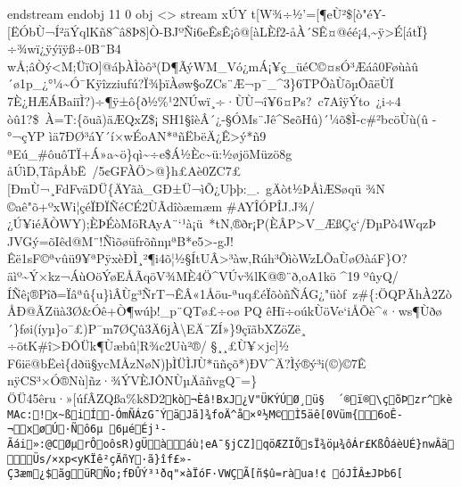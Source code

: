 \documentclass[
]{article}
\begin{document}
{{{{{{{endstream
endobj
11 0 obj
\textless{}\textgreater{}
stream
xÚY t{[}W¾÷½'={[}¶eÙ²\${[}ò"éY-{[}ËÓbÙ¬Í²äÝqlKñ8\^{}â8Þ8{]}Ò-BJºÑi6\textquotesingle eÊsÊ¡ô@{[}àLÈf2-åÀ´SÊ¤@éé¡4,\textasciitildeÿ\textgreater É{[}átÏ\}÷¾wï¿\textbar ÿýïÿß÷0B¨B4
wÅ;âÒý\textless M;ÜïO{]}@\textquotesingle áþÀÌòô³(D¶ÃýWM\_Vó¿mÁ¡¥ç\_üéC©¤sÓ³Æá\textquotesingle â0Føùàû´ø1p\_¿°¼\textasciitilde Ó¯Kÿîzziufú?Ï¾þïÀøw§oZCs¨Æ¬p¯\_\^{}3\}6TPÕàÙõµÕãëÙÏ 7È¿HÆÁBaiïÌ?)÷¶ÿ±ô\{ð½\%¹2NÚwï¸÷·ÙÙ¬î¥6¤Ps?~c7AîÿÝto~¿i÷4
òû1?\$~À=T:\{õuã)äÆQxZ\$¡ SH1§îèÂ´¿-§ÓMs¨Jê\^{}S¢õHû)´¼õ\$Ì\textbar{}-c\#²bcöÙ­ù(û -°¬çYP
ìä7ÐØ³áY´í×wÉoAN*ªñËbëÄ¿Ê\textgreaterý*ñ9ªEú\_\#ôuôTÏ+Á»a\textasciitilde ö\}qì\textasciitilde÷e\$Á½Èc\textasciitilde ü:½øjöMüzö8g
åÚìD,TâpÅbË~\textquotesingle/5¢GFÀÖ\textgreater@\}h£Aè0ZC7£{[}ÐmÙ¬¸FdFväDÜ\{ÄYãà\_GÐ±Ü¬ìÕ¿Uþþ­:\_.~gÄòt½ÞÅìÆSøqü
¾N©aê"õ+ºxWi¦çéÏÐÏÑéCÉ2ÙÃdîòæmæm \#AYÎÓPÎJ.J¾/¿Ú¥iéÃÒWY);ÈÞÉòMöRAyA¨`¹à¡ü~*tN,\textbar®ðr¡P(ÈÂP\textgreaterV\_ÆßÇç`/ÐµPò4WqzÞ
JVGý=õIêd@M¨!ÑìõøüfrõñnµªB*e5\textgreater\textquotesingle-gJ!Êë1sF©ªvûü9¥ªPÿxèÐÌ¸²¶i4õ¦½§ÍtUÂ\textgreater³àw,Rúh³ÕìòWzLÕ­aÙøØàáF\}O?äìº\textasciitilde Ý×kz¬ÁùOöÝøEÅÃqöV¾MÈ4Ö\^{}VÚv¾lK@®¨ð,oA1kö \^{}19 ºûyQ/ÍÑ\textbar ê¡®Pî\textbar ð=Ïâªû\{u\}ìÂÙg³ÑrT¬ÊÂ«1Åöu-ªuq£éÏ\textbar õòñÑÁG¿"üòf~z\#\{:ÖQPÃhÀ2Zò
ÅÐ@ÃZüà3Ø\&Óê+Ò¶wúþ!\_p¨QTø£÷oø
PQ
êHï÷oúkÙöVe`iÅÕè\^{}«·ws¶Ùðø´\}føi(íyµ\}o¯£)P¯m7ØÇ­û3Ä6jÀ\textbackslash\textbarEÄ¯ZÍ»\}9çïãbXZöZë¸÷ötK\#î\textgreater ÐÔÜk¶Ùæbû¦R¾c2Uù²®/
§¸¸£Ù¥×j­c{]}½
F6ië@bËeì\{dðü§ycMÅzNøN)þÌÜÌJÙ*\textquotesingle üñçõ*)ÐV\^{}Ä?Ìý®ý³i(©)©7Ê
nÿCS³×Ó®Nù{]}ñz·¾ÝVÈJÔNÙµÄãñvgQ¯=\}ÖÜ45êru·»{[}úfÂZQßa\%k8D2\texttt{kò¬Èâ!\textbar{}BxJ¿V"ÜKÝÚØ¸ü§\ \ ´®ï®\textbackslash{}çõÞzr\^{}kèM­Ac:!x\textasciitilde{}ßiÍ-ÓmÑÁzG¯ÝäJã{]}¾foÄ\^{}å×º½M©Ì5äê{[}0V\textquotesingle{}üm\{6oÊ­¬x\textquotesingle{}øÚ·Ñô6µ\ 6µéÉj¹­Ãái»:@CØµrÔoôsR)gÜàáù¦eA¯§jCZ{]}qöÆZIÕsÏ¾öµ¾ôÁr£Kß\textbar{}ÔáèUÉ\}nwÂäÜs/×xp\textless{}yKÏê²çÄñY·ã\}îf£»­Ç3æm¿\$ãgüRÑo;fÐÛÝ³¹ðq"×àÏóF·VWÇÃ{[}ñ\$û=ràua!¢\ óJÎÂ±JÞb6{[}
}}}}}}}}
\end{document}
